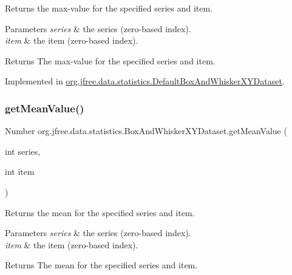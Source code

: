 Returns the max-\/value for the specified series and item.


\begin{DoxyParams}{Parameters}
{\em series} & the series (zero-\/based index). \\
\hline
{\em item} & the item (zero-\/based index).\\
\hline
\end{DoxyParams}
\begin{DoxyReturn}{Returns}
The max-\/value for the specified series and item. 
\end{DoxyReturn}


Implemented in \mbox{\hyperlink{classorg_1_1jfree_1_1data_1_1statistics_1_1_default_box_and_whisker_x_y_dataset_a67ab411220452537047ac852330bd0c0}{org.\+jfree.\+data.\+statistics.\+Default\+Box\+And\+Whisker\+X\+Y\+Dataset}}.

\mbox{\label{interfaceorg_1_1jfree_1_1data_1_1statistics_1_1_box_and_whisker_x_y_dataset_a8057b4eb916e10c4fa9d9bc4a5d19bde}} 
\subsubsection{\texorpdfstring{get\+Mean\+Value()}{getMeanValue()}}
{\footnotesize\ttfamily Number org.\+jfree.\+data.\+statistics.\+Box\+And\+Whisker\+X\+Y\+Dataset.\+get\+Mean\+Value (\begin{DoxyParamCaption}\item[{int}]{series,  }\item[{int}]{item }\end{DoxyParamCaption})}

Returns the mean for the specified series and item.


\begin{DoxyParams}{Parameters}
{\em series} & the series (zero-\/based index). \\
\hline
{\em item} & the item (zero-\/based index).\\
\hline
\end{DoxyParams}
\begin{DoxyReturn}{Returns}
The mean for the specified series and item. 
\end{DoxyReturn}


